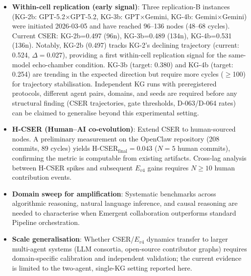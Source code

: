 \documentclass[12pt]{article}
\begin{document}
\begin{itemize}
  \item \textbf{Within-cell replication (early signal)}: Three replication-B instances
        (KG-2b: GPT-5.2$\times$GPT-5.2, KG-3b: GPT$\times$Gemini, KG-4b: Gemini$\times$Gemini)
        were initiated 2026-03-05 and have reached 96--136 nodes (48--68 cycles).
        Current CSER: KG-2b=0.497 (96n), KG-3b=0.489 (134n), KG-4b=0.531 (136n).
        Notably, KG-2b (0.497) tracks KG-2's declining trajectory (current: 0.524, $\Delta=0.027$),
        providing a first within-cell replication signal for the same-model echo-chamber condition.
        KG-3b (target: 0.380) and KG-4b (target: 0.254) are trending in the expected direction
        but require more cycles ($\geq$100) for trajectory stabilisation.
        Independent KG runs with preregistered protocols,
        different agent pairs, domains, and seeds are required before any structural finding
        (CSER trajectories, gate thresholds, D-063/D-064 rates) can be claimed to generalise
        beyond this experimental setting.

  \item \textbf{H-CSER (Human--AI co-evolution)}: Extend CSER to human-sourced nodes.
        A preliminary measurement on the OpenClaw repository (208 commits, 89 cycles)
        yields H-CSER$_{\text{final}} = 0.043$ ($N=5$ human commits), confirming the
        metric is computable from existing artifacts. Cross-lag analysis between H-CSER
        spikes and subsequent $E_{v4}$ gains requires $N \geq 10$ human contribution events.

  \item \textbf{Domain sweep for amplification}: Systematic benchmarks across algorithmic
        reasoning, natural language inference, and causal reasoning are needed to characterise
        when Emergent collaboration outperforms standard Pipeline orchestration.

  \item \textbf{Scale generalisation}: Whether CSER/$E_{v4}$ dynamics transfer to larger
        multi-agent systems (LLM consortia, open-source contributor graphs) requires
        domain-specific calibration and independent validation; the current evidence is
        limited to the two-agent, single-KG setting reported here.
\end{itemize}

\end{document}
